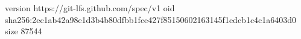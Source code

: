 version https://git-lfs.github.com/spec/v1
oid sha256:2ec1ab42a98e1d3b4b80dfbb1fce427f85150602163145f1edcb1c4c1a6403d0
size 87544
